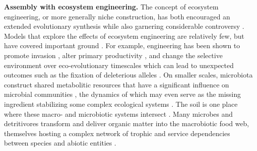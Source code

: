 \documentclass[twocolumn,preprintnumbers,amsmath,amssymb,superscriptaddress,linenumbers]{revtex4-1}
\begin{document}
\vspace{0mm}
\noindent \textbf{Assembly with ecosystem engineering.}
The concept of ecosystem engineering, or more generally niche construction, has both encouraged an extended evolutionary synthesis \cite{Laland2015} while also garnering considerable controversy \cite{Gupta2017,Feldman2017}.
Models that explore the effects of ecosystem engineering are relatively few, but have covered important ground \cite{Hastings2007,OdlingSmee2013}.
For example, engineering has been shown to promote invasion \cite{Cuddington2004}, alter primary productivity \cite{Wright2004}, and change the selective environment over eco-evolutionary timescales \cite{Kylafis2008,Krakauer2009} which can lead to unexpected outcomes such as the fixation of deleterious alleles \cite{Laland1999}.
On smaller scales, microbiota construct shared metabolitic resources that have a significant influence on microbial communities \cite{Kallus2017}, the dynamics of which may even serve as the missing ingredient stabilizing some complex ecological systems \cite{Butler2018}.
The soil is one place where these macro- and microbiotic systems intersect \cite{Amundson2015}.
Many microbes and detritivores transform and deliver organic matter into the macrobiotic food web, themselves hosting a complex network of trophic and service dependencies between species and abiotic entities \cite{Gutierrez2006,Jouquet2006}.
\end{document}
